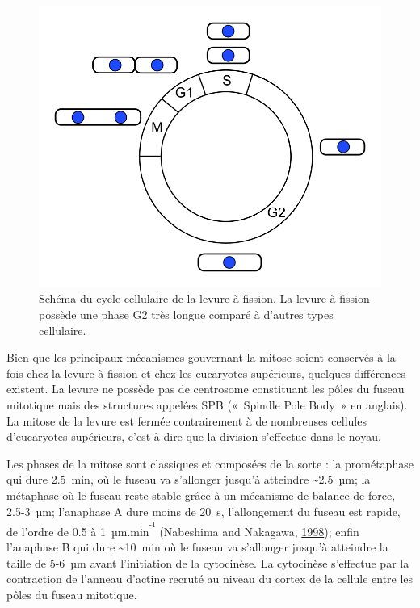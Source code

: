 \documentclass[12pt,a4paper,twoside,openright]{book}
\begin{document}
\begin{figure}[htbp]
\centering
\includegraphics{figures/intro/pombe_cell_cycle.png}
\caption[Schéma du cycle cellulaire de la levure à fission]{\label{fig:pombe-cell-cycle}Schéma
du cycle cellulaire de la levure à fission. La levure à fission possède
une phase G2 très longue comparé à d'autres types cellulaire.}
\end{figure}

Bien que les principaux mécanismes gouvernant la mitose soient conservés
à la fois chez la levure à fission et chez les eucaryotes supérieurs,
quelques différences existent. La levure ne possède pas de centrosome
constituant les pôles du fuseau mitotique mais des structures appelées
SPB («~Spindle Pole Body~» en anglais). La mitose de la levure est
fermée contrairement à de nombreuses cellules d'eucaryotes supérieurs,
c'est à dire que la division s'effectue dans le noyau.

Les phases de la mitose sont classiques et composées de la sorte : la
prométaphase qui dure 2.5~min, où le fuseau va s'allonger jusqu'à
atteindre \textasciitilde{}2.5~µm; la métaphase où le fuseau reste
stable grâce à un mécanisme de balance de force, 2.5-3~µm; l'anaphase A
dure moins de 20~s, l'allongement du fuseau est rapide, de l'ordre de
0.5 à 1~µm.min\textsuperscript{\textsuperscript{-1}} (Nabeshima and
Nakagawa, \protect\hyperlink{ref-Nabeshima1998}{1998}); enfin l'anaphase
B qui dure \textasciitilde{}10~min où le fuseau va s'allonger jusqu'à
atteindre la taille de 5-6~µm avant l'initiation de la cytocinèse. La
cytocinèse s'effectue par la contraction de l'anneau d'actine recruté au
niveau du cortex de la cellule entre les pôles du fuseau mitotique.
\end{document}
